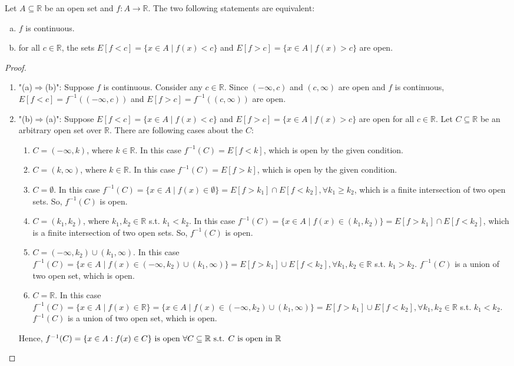 \documentclass[11pt]{elegantbook}
\begin{document}
\begin{proposition}
    Let $A \subseteq \mathbb{R}$ be an open set and $f : A \rightarrow \mathbb{R}$. The two following statements are equivalent:
    \begin{enumerate}[(a).]
        \item $f$ is continuous.
        \item for all $c\in \mathbb{R}$, the sets $E[f<c]=\{x\in A\mid f(x)<c\}$ and $E[f>c]=\{x\in A\mid f(x)>c\}$ are open.
    \end{enumerate}
\end{proposition}
\begin{proof}
\begin{enumerate}
    \item "(a)$\Rightarrow$(b)": Suppose $f$ is continuous. Consider any $c\in \mathbb{R}$. Since $(-\infty,c)$ and $(c,\infty)$ are open and $f$ is continuous, $E[f<c]=f^{-1}((-\infty,c))$ and $E[f>c]=f^{-1}((c,\infty))$ are open.
    \item "(b)$\Rightarrow$(a)": Suppose $E[f<c]=\{x\in A\mid f(x)<c\}$ and $E[f>c]=\{x\in A\mid f(x)>c\}$ are open for all $c\in \mathbb{R}$. Let $C\subseteq \mathbb{R}$ be an arbitrary open set over $\mathbb{R}$. There are following cases about the $C$:
    \begin{enumerate}[(1).]
        \item $C=(-\infty,k)$, where $k\in \mathbb{R}$. In this case $f^{-1}(C)=E[f<k]$, which is open by the given condition.
        \item $C=(k,\infty)$, where $k\in \mathbb{R}$. In this case $f^{-1}(C)=E[f>k]$, which is open by the given condition.
        \item $C=\emptyset$. In this case $f^{-1}(C)=\{x\in A\mid f(x)\in \emptyset\}=E[f>k_1]\cap E[f<k_2], \forall k_1\geq k_2$, which is a finite intersection of two open sets. So, $f^{-1}(C)$ is open.
        \item $C=(k_1,k_2)$, where $k_1,k_2\in \mathbb{R}$ s.t. $k_1<k_2$. In this case $f^{-1}(C)=\{x\in A\mid f(x)\in (k_1,k_2)\}=E[f>k_1]\cap E[f<k_2]$, which is a finite intersection of two open sets. So, $f^{-1}(C)$ is open.
        \item $C=(-\infty,k_2)\cup(k_1,\infty)$. In this case $f^{-1}(C)=\{x\in A\mid f(x)\in (-\infty,k_2)\cup(k_1,\infty)\}=E[f>k_1]\cup E[f<k_2], \forall k_1,k_2\in \mathbb{R}$ s.t. $k_1>k_2$. $f^{-1}(C)$ is a union of two open set, which is open.
        \item $C=\mathbb{R}$. In this case $f^{-1}(C)=\{x\in A\mid f(x)\in \mathbb{R}\}=\{x\in A\mid f(x)\in (-\infty,k_2)\cup(k_1,\infty)\}=E[f>k_1]\cup E[f<k_2], \forall k_1,k_2\in \mathbb{R}$ s.t. $k_1<k_2$. $f^{-1}(C)$ is a union of two open set, which is open.
    \end{enumerate}
    Hence, $f^{-1}(C)=\{x\in A: f(x)\in C\} \textnormal{ is open $\forall C\subseteq \mathbb{R}$ s.t. $C$ is open in $\mathbb{R}$}$
\end{enumerate}
\end{proof}
\end{document}
